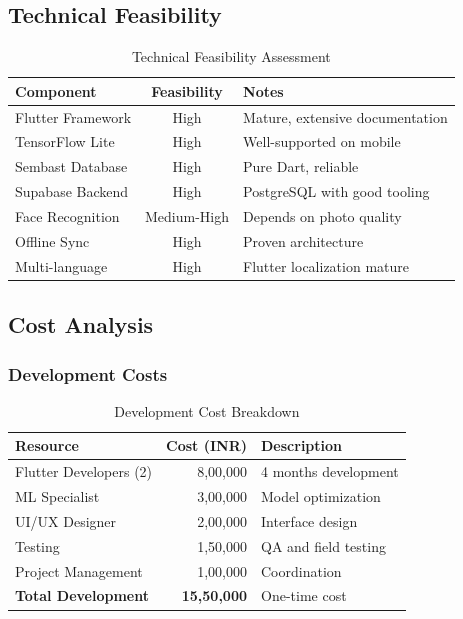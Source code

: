 \documentclass[12pt,a4paper]{article}
\begin{document}
\subsection{Technical Feasibility}
\begin{table}[H]
\centering
\small
\begin{tabularx}{\textwidth}{|l|c|X|}
\hline
\rowcolor{lightgray}
\textbf{Component} & \textbf{Feasibility} & \textbf{Notes} \\
\hline
Flutter Framework & High & Mature, extensive documentation \\
\hline
TensorFlow Lite & High & Well-supported on mobile \\
\hline
Sembast Database & High & Pure Dart, reliable \\
\hline
Supabase Backend & High & PostgreSQL with good tooling \\
\hline
Face Recognition & Medium-High & Depends on photo quality \\
\hline
Offline Sync & High & Proven architecture \\
\hline
Multi-language & High & Flutter localization mature \\
\hline
\end{tabularx}
\caption{Technical Feasibility Assessment}
\end{table}

\subsection{Cost Analysis}

\subsubsection{Development Costs}
\begin{table}[H]
\centering
\small
\begin{tabularx}{0.9\textwidth}{|l|r|X|}
\hline
\rowcolor{lightgray}
\textbf{Resource} & \textbf{Cost (INR)} & \textbf{Description} \\
\hline
Flutter Developers (2) & 8,00,000 & 4 months development \\
\hline
ML Specialist & 3,00,000 & Model optimization \\
\hline
UI/UX Designer & 2,00,000 & Interface design \\
\hline
Testing & 1,50,000 & QA and field testing \\
\hline
Project Management & 1,00,000 & Coordination \\
\hline
\textbf{Total Development} & \textbf{15,50,000} & One-time cost \\
\hline
\end{tabularx}
\caption{Development Cost Breakdown}
\end{table}
\end{document}

